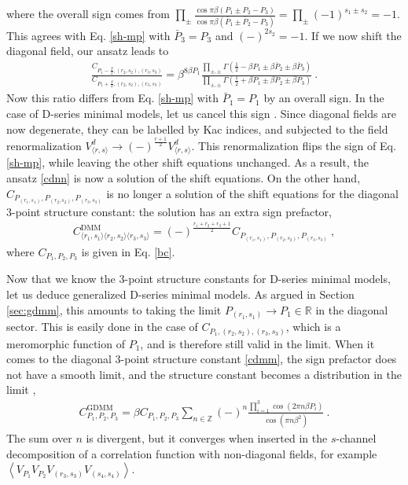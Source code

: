 \documentclass[12pt, a4paper]{article}
\begin{document}
where the overall sign comes from $\prod_\pm \frac{\cos \pi\beta(P_1\pm P_2-P_3)}{\cos\pi\beta(\bar P_1\pm \bar P_2-P_3)} = \prod_\pm (-1)^{s_1\pm s_2} = -1$. This agrees with Eq. \eqref{sh-mp} with $\bar P_3=P_3$ and $(-)^{2s_2}=-1$. If we now shift the diagonal field, our ansatz leads to 
\begin{align}
 \frac{C_{P_1-\frac{\beta}{2},(r_2,s_2),(r_3,s_3)}}{C_{P_1+\frac{\beta}{2},(r_2,s_2),(r_3,s_3)}} =\beta^{8\beta P_1}\frac{\prod_{\pm,\pm} \Gamma(\frac12-\beta P_1\pm \beta\bar P_2\pm \beta \bar P_3)}{\prod_{\pm,\pm} \Gamma(\frac12+\beta P_1\pm \beta P_2\pm \beta P_3)}\ .
\end{align}
Now this ratio differs from Eq. \eqref{sh-mp} with $\bar P_1=P_1$ by an overall sign. 
In the case of D-series minimal models, 
let us cancel this sign . Since diagonal fields are now degenerate, they can be labelled by Kac indices, and subjected to the field renormalization 
$V^d_{\langle r,s\rangle}\to (-)^{\frac{r+1}{2}} V^d_{\langle r,s\rangle}$. 
This renormalization flips the sign of Eq. \eqref{sh-mp}, while leaving the other shift equations unchanged. As a result, the ansatz \eqref{cdnn} is now a solution of the shift equations. On the other hand, $C_{P_{(r_1,s_1)},P_{(r_2,s_2)},P_{(r_3,s_3)}}$ is no longer a solution
of the shift equations for the diagonal 3-point structure constant: the solution has an extra sign prefactor,
\begin{align}
 \boxed{C^\text{DMM}_{\langle r_1,s_1\rangle\langle r_2,s_2\rangle\langle r_3,s_3\rangle} = (-)^\frac{r_1+r_2+r_3+1}{2} C_{P_{(r_1,s_1)},P_{(r_2,s_2)},P_{(r_3,s_3)}}}\ , 
 \label{cdmm}
\end{align}
where $C_{P_1,P_2,P_3}$ is given in Eq. \eqref{bc}.

Now that we know the 3-point structure constants for D-series minimal models, let us deduce generalized D-series minimal models. As argued in Section \ref{sec:gdmm}, this amounts to taking the limit $P_{(r_1,s_1)}\to P_1\in\mathbb{R}$ in the diagonal sector. This is easily done in the case of $C_{P_1,(r_2,s_2),(r_3,s_3)}$, which is a meromorphic function of $P_1$, and is therefore still valid in the limit. When it comes to the diagonal 3-point structure constant \eqref{cdmm}, the sign prefactor does not have a smooth limit, and the structure constant becomes a distribution in the limit \cite{rib19},
\begin{align}
 \boxed{C^\text{GDMM}_{P_1,P_2,P_3} = \beta C_{P_1,P_2,P_3}\sum_{n\in\mathbb{Z}}(-)^n \frac{\prod_{i=1}^3 \cos(2\pi n\beta P_i)}{\cos(\pi n\beta^2)}}\ .
 \label{cgdmm}
\end{align}
The sum over $n$ is divergent, but it converges when inserted in the $s$-channel decomposition of a correlation function with non-diagonal fields, for example $\left<V_{P_1}V_{P_2}V_{(r_3,s_3)}V_{(s_4,s_4)}\right>$. 
\end{document}
